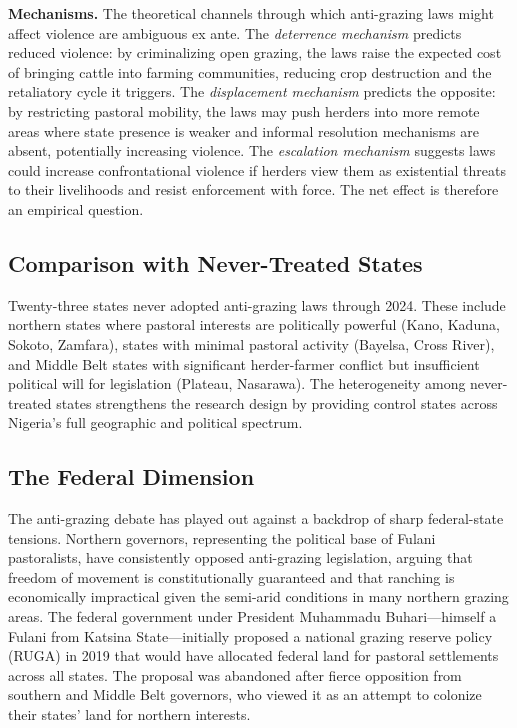 \documentclass[12pt]{article}
\begin{document}
\textbf{Mechanisms.} The theoretical channels through which anti-grazing laws might affect violence are ambiguous ex ante. The \textit{deterrence mechanism} predicts reduced violence: by criminalizing open grazing, the laws raise the expected cost of bringing cattle into farming communities, reducing crop destruction and the retaliatory cycle it triggers. The \textit{displacement mechanism} predicts the opposite: by restricting pastoral mobility, the laws may push herders into more remote areas where state presence is weaker and informal resolution mechanisms are absent, potentially increasing violence. The \textit{escalation mechanism} suggests laws could increase confrontational violence if herders view them as existential threats to their livelihoods and resist enforcement with force. The net effect is therefore an empirical question.

\subsection{Comparison with Never-Treated States}

Twenty-three states never adopted anti-grazing laws through 2024. These include northern states where pastoral interests are politically powerful (Kano, Kaduna, Sokoto, Zamfara), states with minimal pastoral activity (Bayelsa, Cross River), and Middle Belt states with significant herder-farmer conflict but insufficient political will for legislation (Plateau, Nasarawa). The heterogeneity among never-treated states strengthens the research design by providing control states across Nigeria's full geographic and political spectrum.

\subsection{The Federal Dimension}

The anti-grazing debate has played out against a backdrop of sharp federal-state tensions. Northern governors, representing the political base of Fulani pastoralists, have consistently opposed anti-grazing legislation, arguing that freedom of movement is constitutionally guaranteed and that ranching is economically impractical given the semi-arid conditions in many northern grazing areas. The federal government under President Muhammadu Buhari---himself a Fulani from Katsina State---initially proposed a national grazing reserve policy (RUGA) in 2019 that would have allocated federal land for pastoral settlements across all states. The proposal was abandoned after fierce opposition from southern and Middle Belt governors, who viewed it as an attempt to colonize their states' land for northern interests.
\end{document}
